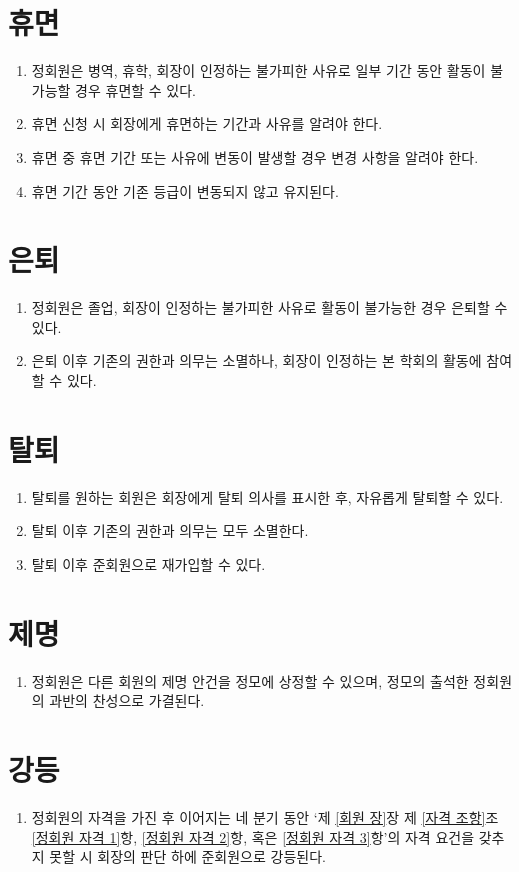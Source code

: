 \documentclass{oblivoir}
\begin{document}
\section{휴면}
\begin{enumerate}
    \item 정회원은 병역, 휴학, 회장이 인정하는 불가피한 사유로 일부 기간 동안 활동이 불가능할
          경우 휴면할 수 있다.
    \item 휴면 신청 시 회장에게 휴면하는 기간과 사유를 알려야 한다.
    \item 휴면 중 휴면 기간 또는 사유에 변동이 발생할 경우 변경 사항을 알려야 한다.
    \item 휴면 기간 동안 기존 등급이 변동되지 않고 유지된다.
\end{enumerate}

\section{은퇴}
\begin{enumerate}
    \item
          정회원은 졸업, 회장이 인정하는 불가피한 사유로 활동이 불가능한 경우 은퇴할 수 있다.
    \item
          은퇴 이후 기존의 권한과 의무는 소멸하나, 회장이 인정하는 본 학회의 활동에 참여할
          수 있다.
\end{enumerate}

\section{탈퇴}
\begin{enumerate}
    \item  탈퇴를 원하는 회원은 회장에게 탈퇴 의사를 표시한 후, 자유롭게 탈퇴할 수 있다.
    \item  탈퇴 이후 기존의 권한과 의무는 모두 소멸한다.
    \item  탈퇴 이후 준회원으로 재가입할 수 있다.
\end{enumerate}

\section{제명}
\begin{enumerate}
    \item  정회원은 다른 회원의 제명 안건을 정모에 상정할 수 있으며, 정모의 출석한 정회원의 과반의 찬성으로 가결된다.
\end{enumerate}

\section{강등}
\begin{enumerate}
    \item 정회원의 자격을 가진 후 이어지는 네 분기 동안 `제 \ref{회원 장}장 제 \ref{자격 조항}조 \ref{정회원 자격 1}항, \ref{정회원 자격 2}항, 혹은 \ref{정회원 자격 3}항'의 자격 요건을 갖추지 못할 시 회장의 판단 하에 준회원으로 강등된다.
\end{enumerate}
\end{document}
